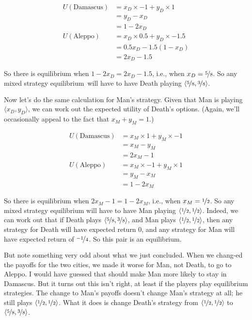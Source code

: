 \documentclass[11pt,]{article}
\begin{document}
\begin{align*}
U(\text{Damascus}) &= x_D \times -1 + y_D \times 1 \\
&= y_D - x_D \\
&= 1 - 2x_D \\
U(\text{Aleppo}) &= x_D \times 0.5 + y_D \times -1.5 \\
&= 0.5x_D - 1.5(1 - x_D) \\
&= 2x_D - 1.5 
\end{align*}

So there is equilibrium when \(1 - 2x_D = 2x_D - 1.5\), i.e., when
\(x_D = \nicefrac{5}{8}\). So any mixed strategy equilibrium~will have
to have Death playing
\(\langle \nicefrac{5}{8}, \nicefrac{3}{8} \rangle\).

Now let's do the same calculation for Man's strategy. Given that Man is
playing \(\langle x_D, y_D \rangle\), we can work out the expected
utility of Death's options. (Again, we'll occasionally appeal to the
fact that \(x_M + y_M = 1\).)

\begin{align*}
U(\text{Damascus}) &= x_M \times 1 + y_M \times -1 \\
&= x_M - y_M \\
&= 2x_M - 1 \\
U(\text{Aleppo}) &= x_M \times -1 + y_M \times 1 \\
&= y_M - x_M \\
&= 1 - 2x_M 
\end{align*}

So there is equilibrium when \(2x_M - 1 = 1 - 2x_M\), i.e., when
\(x_M = \nicefrac{1}{2}\). So any mixed strategy equilibrium will have
to have Man playing
\(\langle \nicefrac{1}{2}, \nicefrac{1}{2} \rangle\). Indeed, we can
work out that if Death plays
\(\langle \nicefrac{5}{8}, \nicefrac{3}{8} \rangle\), and Man plays
\(\langle \nicefrac{1}{2}, \nicefrac{1}{2} \rangle\), then any strategy
for Death will have expected return 0, and any strategy for Man will
have expected return of \(\nicefrac{-1}{4}\). So this pair is an
equilibrium.

But note something very odd about what we just concluded. When we
chang-ed the payoffs for the two cities, we made it worse for Man, not
Death, to go to Aleppo. I would have guessed that should make Man more
likely to stay in Damascus. But it turns out this isn't right, at least
if the players play equilibrium strategies. The change to Man's payoffs
doesn't change Man's strategy at all; he still plays
\(\langle \nicefrac{1}{2}, \nicefrac{1}{2} \rangle\). What it does is
change Death's strategy from
\(\langle \nicefrac{1}{2}, \nicefrac{1}{2} \rangle\) to
\(\langle \nicefrac{5}{8}, \nicefrac{3}{8} \rangle\).
\end{document}
